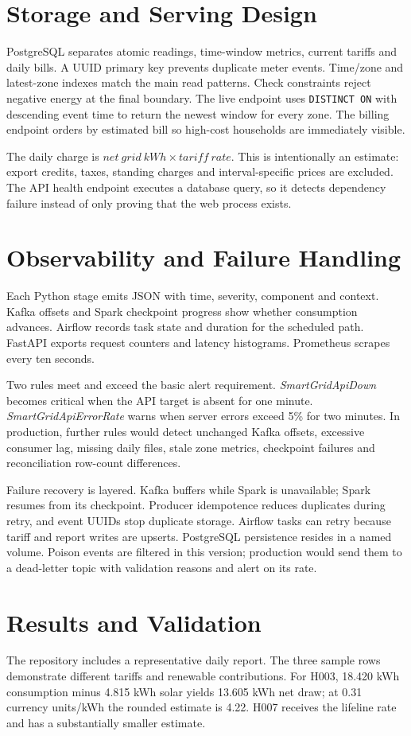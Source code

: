 \documentclass[11pt,a4paper]{article}
\newcommand{\code}[1]{\texttt{#1}}
\begin{document}
\section{Storage and Serving Design}
PostgreSQL separates atomic readings, time-window metrics, current tariffs and daily bills. A UUID primary key prevents duplicate meter events. Time/zone and latest-zone indexes match the main read patterns. Check constraints reject negative energy at the final boundary. The live endpoint uses \code{DISTINCT ON} with descending event time to return the newest window for every zone. The billing endpoint orders by estimated bill so high-cost households are immediately visible.

The daily charge is $net\ grid\ kWh \times tariff\ rate$. This is intentionally an estimate: export credits, taxes, standing charges and interval-specific prices are excluded. The API health endpoint executes a database query, so it detects dependency failure instead of only proving that the web process exists.

\section{Observability and Failure Handling}
Each Python stage emits JSON with time, severity, component and context. Kafka offsets and Spark checkpoint progress show whether consumption advances. Airflow records task state and duration for the scheduled path. FastAPI exports request counters and latency histograms. Prometheus scrapes every ten seconds.

Two rules meet and exceed the basic alert requirement. \textit{SmartGridApiDown} becomes critical when the API target is absent for one minute. \textit{SmartGridApiErrorRate} warns when server errors exceed 5\% for two minutes. In production, further rules would detect unchanged Kafka offsets, excessive consumer lag, missing daily files, stale zone metrics, checkpoint failures and reconciliation row-count differences.

Failure recovery is layered. Kafka buffers while Spark is unavailable; Spark resumes from its checkpoint. Producer idempotence reduces duplicates during retry, and event UUIDs stop duplicate storage. Airflow tasks can retry because tariff and report writes are upserts. PostgreSQL persistence resides in a named volume. Poison events are filtered in this version; production would send them to a dead-letter topic with validation reasons and alert on its rate.

\section{Results and Validation}
The repository includes a representative daily report. The three sample rows demonstrate different tariffs and renewable contributions. For H003, 18.420 kWh consumption minus 4.815 kWh solar yields 13.605 kWh net draw; at 0.31 currency units/kWh the rounded estimate is 4.22. H007 receives the lifeline rate and has a substantially smaller estimate.
\end{document}
